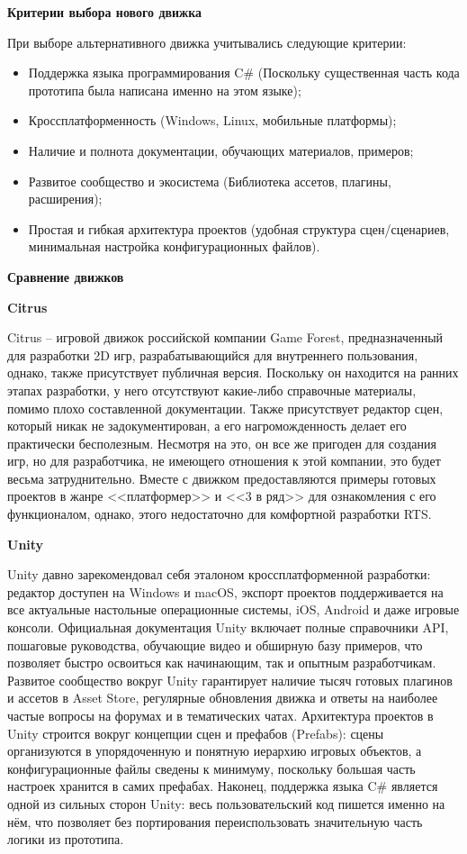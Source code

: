         \textbf{Критерии выбора нового движка}

        При выборе альтернативного движка учитывались следующие критерии:
        \begin{itemize}
            \item Поддержка языка программирования C\# (Поскольку существенная часть кода прототипа была написана именно на этом языке);
            \item Кроссплатформенность (Windows, Linux, мобильные платформы);
            \item Наличие и полнота документации, обучающих материалов, примеров;
            \item Развитое сообщество и экосистема (Библиотека ассетов, плагины, расширения);
            \item Простая и гибкая архитектура проектов (удобная структура сцен/сценариев, минимальная настройка конфигурационных файлов).
        \end{itemize}


        \textbf{Сравнение движков}

        \textbf{Citrus}

        Citrus -- игровой движок российской компании Game Forest, предназначенный для разработки 2D игр, разрабатывающийся для внутреннего пользования, однако, также присутствует публичная версия. Поскольку он находится на ранних этапах разработки, у него отсутствуют какие-либо справочные материалы, помимо плохо составленной документации. Также присутствует редактор сцен, который никак не задокументирован, а его нагроможденность делает его практически бесполезным. Несмотря на это, он все же пригоден для создания игр, но для разработчика, не имеющего отношения к этой компании, это будет весьма затруднительно. Вместе с движком предоставляются примеры готовых проектов в жанре <<платформер>> и <<3 в ряд>> для ознакомления с его функционалом, однако, этого недостаточно для комфортной разработки RTS.

        \textbf{Unity}

        Unity давно зарекомендовал себя эталоном кроссплатформенной разработки: редактор доступен на Windows и macOS, экспорт проектов поддерживается на все актуальные настольные операционные системы, iOS, Android и даже игровые консоли. Официальная документация Unity включает полные справочники API, пошаговые руководства, обучающие видео и обширную базу примеров, что позволяет быстро освоиться как начинающим, так и опытным разработчикам. Развитое сообщество вокруг Unity гарантирует наличие тысяч готовых плагинов и ассетов в Asset Store, регулярные обновления движка и ответы на наиболее частые вопросы на форумах и в тематических чатах. Архитектура проектов в Unity строится вокруг концепции сцен и префабов (Prefabs): сцены организуются в упорядоченную и понятную иерархию игровых объектов, а конфигурационные файлы сведены к минимуму, поскольку большая часть настроек хранится в самих префабах. Наконец, поддержка языка C\# является одной из сильных сторон Unity: весь пользовательский код пишется именно на нём, что позволяет без портирования переиспользовать значительную часть логики из прототипа.
        
